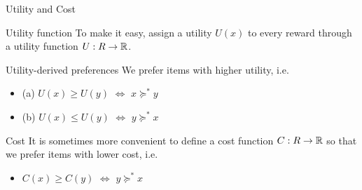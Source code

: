 \documentclass[smaller]{beamer}
\begin{document}
\begin{frame}[label={sec:org47cff15}]{Utility and Cost}
\pause
\begin{block}{Utility function}
To make it easy, assign a utility \(U(x)\) to every reward through a
utility function \(U : R \to \mathbb{R}\).
\end{block}

\begin{block}{Utility-derived preferences}
We prefer items with higher utility, i.e.
\begin{itemize}
\item (a) \(U(x) \geq U(y)\) \(\Leftrightarrow\) \(x \succeq^* y\)
\item (b) \(U(x) \leq U(y)\) \(\Leftrightarrow\) \(y \succeq^* x\)
\end{itemize}
\pause
\end{block}
\begin{block}{Cost}
It is sometimes more convenient to define a cost function \(C: R \to \mathbb{R}\) so that we prefer items with lower cost, i.e.
\begin{itemize}
\item \(C(x) \geq C(y)\) \(\Leftrightarrow\) \(y \succeq^* x\)
\end{itemize}
\end{block}
\end{frame}
\end{document}

